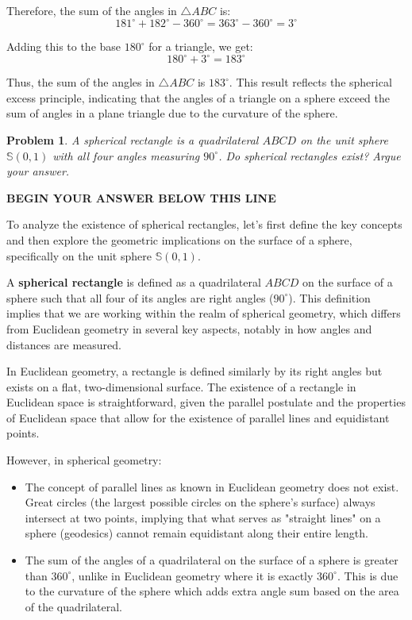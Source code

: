 \documentclass[letter,12pt]{article}
\newtheorem{problem}[main_theorem]{Problem}
\newcommand{\answerspacetop}{
	\begin{center}
		\textbf{BEGIN YOUR ANSWER BELOW THIS LINE} \\ \hrulefill
	\end{center}
}
\begin{document}
Therefore, the sum of the angles in $\triangle ABC$ is:
$$
181^\circ + 182^\circ - 360^\circ = 363^\circ - 360^\circ = 3^\circ
$$

Adding this to the base $180^\circ$ for a triangle, we get:
$$
180^\circ + 3^\circ = 183^\circ
$$

Thus, the sum of the angles in $\triangle ABC$ is $183^\circ$. This result reflects the spherical excess principle, indicating that the angles of a triangle on a sphere exceed the sum of angles in a plane triangle due to the curvature of the sphere.
\pagebreak

\begin{problem}A spherical rectangle is a quadrilateral $ABCD$ on the unit sphere $\mathbb{S}(0, 1)$ with all four angles measuring $90^\circ$. Do spherical rectangles exist? Argue your answer.
\end{problem}
\answerspacetop
To analyze the existence of spherical rectangles, let's first define the key concepts and then explore the geometric implications on the surface of a sphere, specifically on the unit sphere $\mathbb{S}(0, 1)$.

A \textbf{spherical rectangle} is defined as a quadrilateral $ABCD$ on the surface of a sphere such that all four of its angles are right angles ($90^\circ$). This definition implies that we are working within the realm of spherical geometry, which differs from Euclidean geometry in several key aspects, notably in how angles and distances are measured.

In Euclidean geometry, a rectangle is defined similarly by its right angles but exists on a flat, two-dimensional surface. The existence of a rectangle in Euclidean space is straightforward, given the parallel postulate and the properties of Euclidean space that allow for the existence of parallel lines and equidistant points.

However, in spherical geometry:
\begin{itemize}
	\item The concept of parallel lines as known in Euclidean geometry does not exist. Great circles (the largest possible circles on the sphere's surface) always intersect at two points, implying that what serves as "straight lines" on a sphere (geodesics) cannot remain equidistant along their entire length.
	\item The sum of the angles of a quadrilateral on the surface of a sphere is greater than $360^\circ$, unlike in Euclidean geometry where it is exactly $360^\circ$. This is due to the curvature of the sphere which adds extra angle sum based on the area of the quadrilateral.
\end{itemize}
\end{document}

